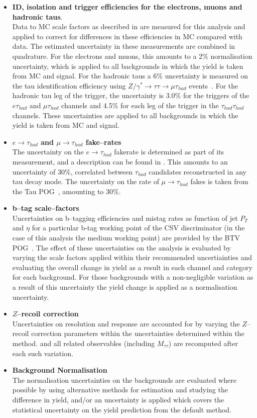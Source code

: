 \begin{itemize}
\item \textbf{ID, isolation and trigger efficiencies for the electrons, muons and
hadronic taus}.\\
Data to MC scale factors as described in \cite{CMS_AN_2013-171}
are measured for this analysis and applied to correct for differences in these
efficiencies in MC compared with data. The estimated uncertainty in these
measurements are combined in quadrature. For the electrons and muons, this
amounts to a 2$\%$ normalisation uncertainty, which is applied to all
backgrounds in which the yield is taken from MC and signal.
For the hadronic taus a 6$\%$ uncertainty
is measured on the tau identification efficiency using 
$Z/\gamma^{*} \to \tau\tau \to \mu\tau_{had}$
events~\cite{TauIDRecommendation}. For the hadronic tau leg of the trigger, the
uncertainty is 3.0$\%$ for the triggers of the $e\tau_{had}$ and $\mu\tau_{had}$
channels and 4.5$\%$ for each leg of the trigger in the $\tau_{had}\tau_{had}$
channels. These uncertainties are applied to all backgrounds in which the yield
is taken from MC and signal.
\item \textbf{$e \to \tau_{had}$ and $\mu \to \tau_{had}$ fake--rates} \\
The uncertainty on the $e \to \tau_{had}$ fakerate is determined as part of
its measurement, and a description can be found in \cite{CMS_AN_2013-171}.
This amounts to an uncertainty of $30\%$, correlated between $\tau_{had}$ candidates
reconstructed in any tau decay mode. The uncertainty on the rate of $\mu \to \tau_{had}$
fakes is taken from the Tau POG~\cite{TauIDRecommendation}, amounting to $30\%$. 
\item \textbf{b--tag scale--factors} \\
Uncertainties on b--tagging efficiencies and mistag rates as function of jet
$P_{T}$ and $\eta$ for a particular b-tag working point of the CSV discriminator
(in the case of this analysis the medium working point) are provided by the BTV 
POG~\cite{BTagSFRecommendation}. The effect of these uncertainties on the
analysis is evaluated by varying the scale factors applied within their
recommended uncertiainties and evaluating the overall change in yield as a
result in each channel and category for each background. For those backgrounds
with a non-negligible variation as a result of this uncertainty the yield change
is applied as a normalisation uncertainty.
\item \textbf{$Z$--recoil correction} \\
Uncertainties on \MET resolution and response are accounted for
by varying the $Z$--recoil correction parameters within the uncertainties determined within the method.
\MET and all \MET related observables (including $M_{\tau\tau}$) are recomputed after each such variation.
\item \textbf{Background Normalisation} \\
The normalisation uncertainties on the backgrounds are evaluated where possible
by using alternative methods for estimation and studying the difference in yield,
and/or an uncertainty is applied which covers the statistical uncertainty on the
yield prediction from the default method. 


\end{itemize}
